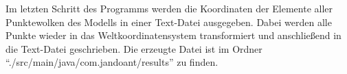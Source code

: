 Im letzten Schritt des Programms werden die Koordinaten der Elemente aller Punktewolken des Modells in einer Text-Datei ausgegeben. Dabei werden alle Punkte wieder in das Weltkoordinatensystem transformiert und anschließend in die Text-Datei geschrieben. Die erzeugte Datei ist im Ordner {"`./src/\-main/\-java/\-com.jandoant/results"'} zu finden. 

 

 






         




    




           




           


       

        








    













  
